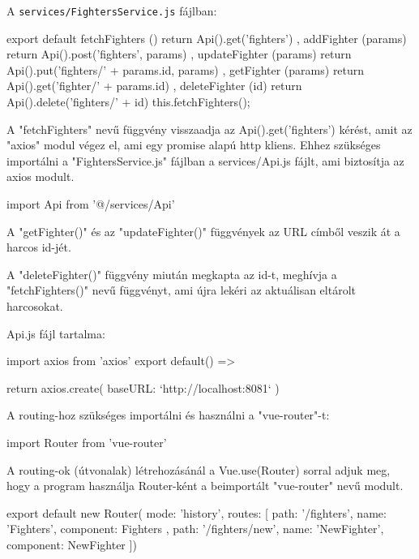 


A \texttt{services/FightersService.js} fájlban:

\begin{cpp}
export default {
  fetchFighters () {
    return Api().get('fighters')
  }, 
  addFighter (params) {
    return Api().post('fighters', params)
  },
  updateFighter (params) {
    return Api().put('fighters/' + params.id, params)
  },
  getFighter (params) {
    return Api().get('fighter/' + params.id)
  },
  deleteFighter (id) {
    return Api().delete('fighters/' + id)
    this.fetchFighters();
  }
}
\end{cpp}

A "fetchFighters" nevű függvény visszaadja az Api().get(’fighters’) kérést, amit az "axios" modul végez el, ami egy promise alapú http kliens. Ehhez szükséges importálni a "FightersService.js" fájlban a services/Api.js fájlt, ami biztosítja az axios modult.

\begin{cpp}
import Api from '@/services/Api'
\end{cpp}

A "getFighter()" és az "updateFighter()" függvények az URL címből veszik át a harcos id-jét.

A "deleteFighter()" függvény miután megkapta az id-t, meghívja a "fetchFighters()" nevű függvényt, ami újra lekéri az aktuálisan eltárolt harcosokat.

Api.js fájl tartalma:

\begin{cpp}
import axios from 'axios'
export default() => {

  return axios.create({
    baseURL: `http://localhost:8081`
  })
}
\end{cpp}


A routing-hoz szükséges importálni és használni a "vue-router"-t:

\begin{cpp}
import Router from 'vue-router'
\end{cpp}

A routing-ok (útvonalak) létrehozásánál a Vue.use(Router) sorral adjuk meg, hogy a program használja Router-ként a beimportált "vue-router" nevű modult.

\begin{cpp}
export default new Router({
mode: 'history',
  routes: [
{
      path: '/fighters',
      name: 'Fighters',
      component: Fighters
  },
  {
      path: '/fighters/new',
      name: 'NewFighter',
      component: NewFighter  }]})
\end{cpp}

